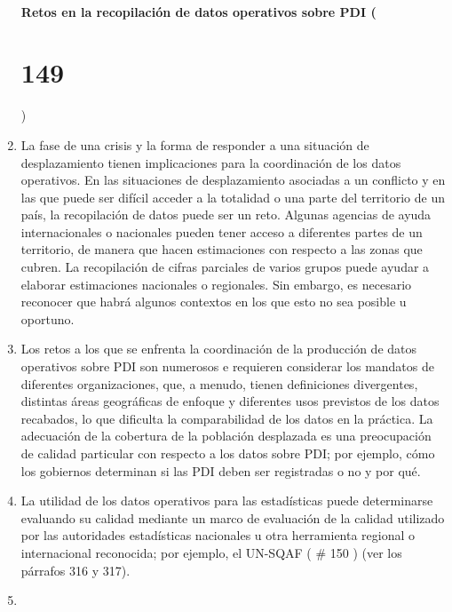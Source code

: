 \documentclass[
]{book}
\begin{document}
\begin{enumerate}
{  \subsubsection{Retos en la recopilación de datos operativos sobre PDI (}\label{retos-en-la-recopilaciuxf3n-de-datos-operativos-sobre-pdi}}

  \hypertarget{section-6}{%
  \chapter{149}\label{section-6}}

  )
\item
  La fase de una crisis y la forma de responder a una situación de desplazamiento tienen implicaciones para la coordinación de los datos operativos. En las situaciones de desplazamiento asociadas a un conflicto y en las que puede ser difícil acceder a la totalidad o una parte del territorio de un país, la recopilación de datos puede ser un reto. Algunas agencias de ayuda internacionales o nacionales pueden tener acceso a diferentes partes de un territorio, de manera que hacen estimaciones con respecto a las zonas que cubren. La recopilación de cifras parciales de varios grupos puede ayudar a elaborar estimaciones nacionales o regionales. Sin embargo, es necesario reconocer que habrá algunos contextos en los que esto no sea posible u oportuno.
\item
  Los retos a los que se enfrenta la coordinación de la producción de datos operativos sobre PDI son numerosos e requieren considerar los mandatos de diferentes organizaciones, que, a menudo, tienen definiciones divergentes, distintas áreas geográficas de enfoque y diferentes usos previstos de los datos recabados, lo que dificulta la comparabilidad de los datos en la práctica. La adecuación de la cobertura de la población desplazada es una preocupación de calidad particular con respecto a los datos sobre PDI; por ejemplo, cómo los gobiernos determinan si las PDI deben ser registradas o no y por qué.
\item
  La utilidad de los datos operativos para las estadísticas puede determinarse evaluando su calidad mediante un marco de evaluación de la calidad utilizado por las autoridades estadísticas nacionales u otra herramienta regional o internacional reconocida; por ejemplo, el UN-SQAF (
  \# 150
  ) (ver los párrafos 316 y 317).
\item ~
  \hypertarget{coordinaciuxf3n-de-estaduxedsticas-oficiales-y-de-datos-operativos}{%
}
\end{enumerate}
\end{document}
